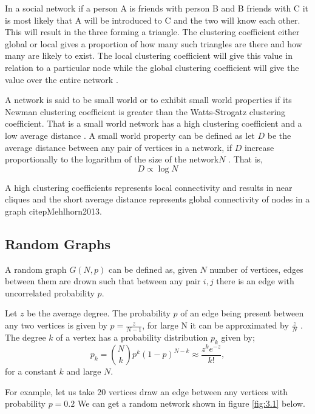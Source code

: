  
In a social network if a person A is friends with person B and B friends with C
it is most likely that A will be introduced to C and the two will know each other. This will result in the three forming a triangle. The clustering coefficient either global or local gives a proportion of how many such triangles are there and how many are likely to exist. The local  clustering coefficient will give this value in relation to a particular node while the global clustering coefficient will give the value over the entire network \citep{estrada2015first}.
 
A network is said to be small world or to exhibit small world properties if its Newman clustering coefficient is greater than the Watts-Strogatz clustering coefficient.
That is a small world network has a high clustering coefficient and a low average distance \citep{estrada2012structure}. A small world property can be defined as let $D$ be the average distance between any pair of vertices in a network, if $D$ increase proportionally to the logarithm of the size of the network$N$ \citep{newman1999scaling}.
That is,
 \begin{equation}
 D \propto \log N
\end{equation}

A high clustering coefficients represents local connectivity and results in near cliques and the short average distance represents global connectivity of nodes in a graph  citep{Mehlhorn2013}.

 
\subsection{Random Graphs} 
A random graph $G(N,p)$ can be defined as, given  $N$ number of vertices, edges between them are drown such that between any pair $i,j$ there is an edge with uncorrelated probability $p$. 

 Let $z$  be the average degree. The probability $p$ of an edge being present between any two vertices is given by $p = \frac{z}{N-1}$, for large N it can be approximated by $\frac{z}{N}$ \citep{newman2002random}. The degree $k$ of a vertex has a probability distribution $p_k$ given by;
 \begin{equation}
 p_k = \binom{N}{k} p^k (1-p)^{N-k} \approx \frac{z^k e^{-z}}{k!},
\end{equation}
for  a constant $k$ and large $N$.

For example, let us take 20 vertices draw  an edge between any vertices with probability $p = 0.2$ We can get a random network shown in
figure
\ref{fig:3.1} below. 
  
